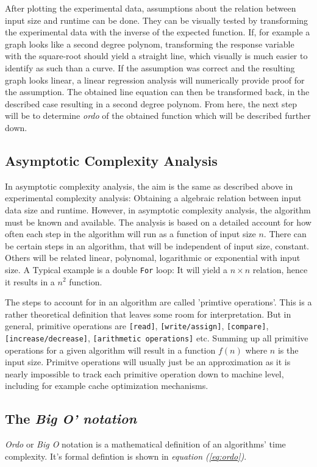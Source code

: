 \documentclass[a4paper,11pt,twoside]{article}
\begin{document}
After plotting the experimental data, assumptions about the relation
between input size and runtime can be done. They can be visually tested
by transforming the experimental data with the inverse of the expected
function. If, for example a graph looks like a second degree polynom,
transforming the response variable with the square-root should yield a
straight line, which visually is much easier to identify as such than
a curve. If the assumption was correct and the resulting graph looks
linear, a linear regression analysis will numerically provide proof
for the assumption. The obtained line equation can then be
transformed back, in the described case resulting in a second degree 
polynom. From here, the next step will be to determine \emph{ordo} of the
obtained function which will be described further down.

\subsection{Asymptotic Complexity Analysis}
In asymptotic complexity analysis, the aim is the same as described
above in experimental complexity analysis: Obtaining a algebraic
relation between input data size and runtime. However, in asymptotic
complexity analysis, the algorithm must be known and available. The
analysis is based on a detailed account for how often each step in the
algorithm will run as a function of input size $n$. There can be
certain steps in an algorithm, that will be independent of input
size, constant. Others will be related linear, polynomal, logarithmic
or exponential with input size. A Typical example is a double
\verb!For! loop: It will yield a $n \times n$ relation, hence it
results in a $n^2$ function.

The steps to account for in an algorithm are called 'primtive
operations'. This is a rather theoretical definition that leaves some
room for interpretation. But in general, primitive operations are
\verb![read]!, \verb![write/assign]!, \verb![compare]!,
\verb![increase/decrease]!, \verb![arithmetic operations]! etc. Summing up
all primitive operations for a given algorithm will result in a
function $f(n)$ where $n$ is the input size.  Primitve operations will
usually just be an approximation as it is nearly impossible to track
each primitive operation down to machine level, including for example
cache optimization mechanisms. 

\subsection{The \emph{Big O' notation}}
\emph{Ordo} or \emph{Big O} notation is a mathematical definition of an algorithms'
time complexity. It's formal defintion is shown in \textit{equation
(\ref{eq:ordo})}\cite[pp. 245]{janlert2000}.  
\end{document}
